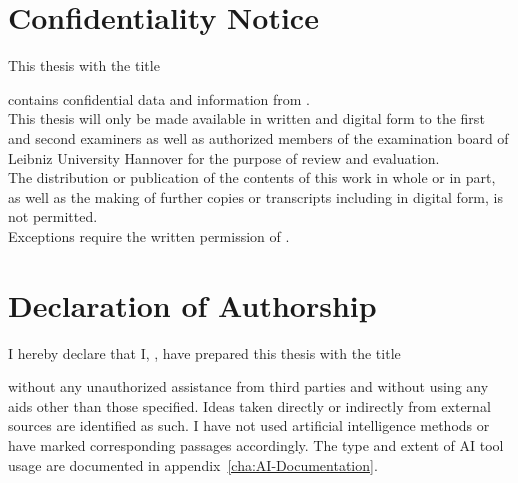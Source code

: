 

\thispagestyle{plain}
\vspace*{9mm}
\section*{Confidentiality Notice}
\label{Confidentiality}
\vspace*{11mm}

This thesis with the title
%
\vspace*{5mm}
\begin{center}
\Large\emph{\titel}
\end{center}
\vspace*{5mm}
%
contains confidential data and information from \companyname.\\

This thesis will only be made available in written and digital form to the first and second examiners as well as authorized members of the examination board of Leibniz University Hannover for the purpose of review and evaluation.\\

The distribution or publication of the contents of this work in whole or in part, as well as the making of further copies or transcripts including in digital form, is not permitted.\\

Exceptions require the written permission of \companyname.

\clearpage


\vspace*{9mm}
\section*{Declaration of Authorship}
\label{Affidavit}
\vspace*{11mm}

I hereby declare that I, \name, have prepared this thesis with the title
%
\begin{center}
\Large{\emph{\titel}}
\end{center}
%
without any unauthorized assistance from third parties and without using any aids other than those specified. Ideas taken directly or indirectly from external sources are identified as such. I have not used artificial intelligence methods or have marked corresponding passages accordingly. The type and extent of AI tool usage are documented in appendix~\ref{cha:AI-Documentation}.%

